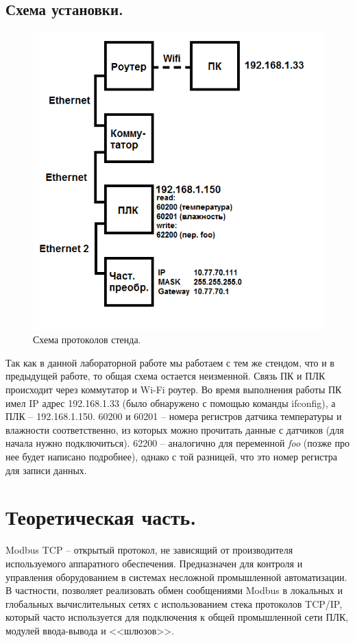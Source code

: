 \documentclass[a4paper, 12pt]{article}
\begin{document}
    \subsection{Схема установки.}
    \begin{figure}[H]
        \centering
        \includegraphics[scale=0.5]{scheme3.png}
        \captionsetup{skip=0pt}
        \caption{Схема протоколов стенда.}
        \label{fig:scheme}
    \end{figure}
    Так как в данной лабораторной работе мы работаем с тем же стендом, что и в предыдущей работе, то
    общая схема остается неизменной. Связь ПК и ПЛК происходит через коммутатор и Wi-Fi роутер. Во время
    выполнения работы ПК имел IP адрес 192.168.1.33 (было обнаружено с помощью команды ifconfig), а ПЛК --
    192.168.1.150. 60200 и 60201 -- номера регистров датчика температуры и влажности соответственно, из которых можно прочитать
    данные с датчиков (для начала нужно подключиться). 62200 -- аналогично для переменной \textit{foo} (позже
    про нее будет написано подробнее), однако с той разницей, что это номер регистра для записи данных.


    \section{Теоретическая часть.}
    Modbus TCP -- открытый протокол, не зависящий от производителя используемого аппаратного обеспечения.
    Предназначен для контроля и управления оборудованием в системах несложной промышленной автоматизации.
    В частности, позволяет реализовать обмен сообщениями Modbus в локальных и глобальных вычислительных сетях
    с использованием стека протоколов TCP/IP, который часто используется для подключения к общей промышленной
    сети ПЛК, модулей ввода-вывода и <<шлюзов>>.
\end{document}
